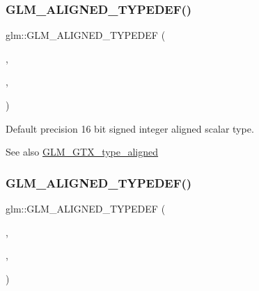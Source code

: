 \subsubsection{\texorpdfstring{G\+L\+M\+\_\+\+A\+L\+I\+G\+N\+E\+D\+\_\+\+T\+Y\+P\+E\+D\+E\+F()}{GLM\_ALIGNED\_TYPEDEF()}\hspace{0.1cm}{\footnotesize\ttfamily [46/209]}}
{\footnotesize\ttfamily glm\+::\+G\+L\+M\+\_\+\+A\+L\+I\+G\+N\+E\+D\+\_\+\+T\+Y\+P\+E\+D\+EF (\begin{DoxyParamCaption}\item[{\hyperlink{group__gtc__type__precision_ga35e5542ca05b29cc256fdafb8503d1fd}{i16}}]{,  }\item[{aligned\+\_\+i16}]{,  }\item[{2}]{ }\end{DoxyParamCaption})}

Default precision 16 bit signed integer aligned scalar type. \begin{DoxySeeAlso}{See also}
\hyperlink{group__gtx__type__aligned}{G\+L\+M\+\_\+\+G\+T\+X\+\_\+type\+\_\+aligned} 
\end{DoxySeeAlso}
\mbox{\label{group__gtx__type__aligned_gad4aefe56691cdb640c72f0d46d3fb532}} 
\subsubsection{\texorpdfstring{G\+L\+M\+\_\+\+A\+L\+I\+G\+N\+E\+D\+\_\+\+T\+Y\+P\+E\+D\+E\+F()}{GLM\_ALIGNED\_TYPEDEF()}\hspace{0.1cm}{\footnotesize\ttfamily [47/209]}}
{\footnotesize\ttfamily glm\+::\+G\+L\+M\+\_\+\+A\+L\+I\+G\+N\+E\+D\+\_\+\+T\+Y\+P\+E\+D\+EF (\begin{DoxyParamCaption}\item[{\hyperlink{group__gtc__type__precision_ga1d8ed5c43e91ea7d4528389da4fa9524}{i32}}]{,  }\item[{aligned\+\_\+i32}]{,  }\item[{4}]{ }\end{DoxyParamCaption})}

